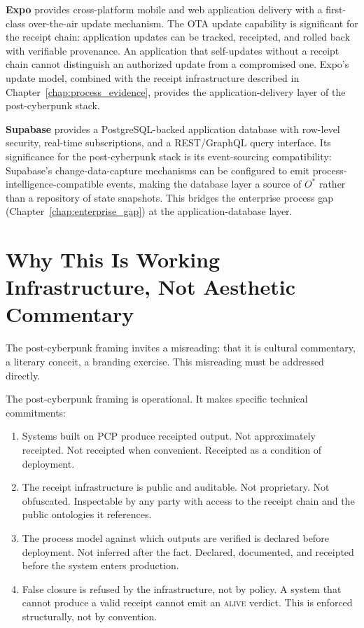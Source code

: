\textbf{Expo} provides cross-platform mobile and web application delivery with a first-class over-the-air update mechanism. The OTA update capability is significant for the receipt chain: application updates can be tracked, receipted, and rolled back with verifiable provenance. An application that self-updates without a receipt chain cannot distinguish an authorized update from a compromised one. Expo's update model, combined with the receipt infrastructure described in Chapter~\ref{chap:process_evidence}, provides the application-delivery layer of the post-cyberpunk stack.

\textbf{Supabase} provides a PostgreSQL-backed application database with row-level security, real-time subscriptions, and a REST/GraphQL query interface. Its significance for the post-cyberpunk stack is its event-sourcing compatibility: Supabase's change-data-capture mechanisms can be configured to emit process-intelligence-compatible events, making the database layer a source of $O^{*}$ rather than a repository of state snapshots. This bridges the enterprise process gap (Chapter~\ref{chap:enterprise_gap}) at the application-database layer.

\section{Why This Is Working Infrastructure, Not Aesthetic Commentary}

The post-cyberpunk framing invites a misreading: that it is cultural commentary, a literary conceit, a branding exercise. This misreading must be addressed directly.

The post-cyberpunk framing is operational. It makes specific technical commitments:

\begin{enumerate}
  \item Systems built on PCP produce receipted output. Not approximately receipted. Not receipted when convenient. Receipted as a condition of deployment.
  \item The receipt infrastructure is public and auditable. Not proprietary. Not obfuscated. Inspectable by any party with access to the receipt chain and the public ontologies it references.
  \item The process model against which outputs are verified is declared before deployment. Not inferred after the fact. Declared, documented, and receipted before the system enters production.
  \item False closure is refused by the infrastructure, not by policy. A system that cannot produce a valid receipt cannot emit an \textsc{alive} verdict. This is enforced structurally, not by convention.
\end{enumerate}

